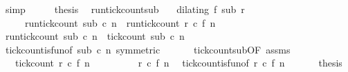 \begin{isabellebody}
\ simp\isanewline
\ \ \isamarkupfalse%
\ \isamarkupfalse%
\ {\isacharquery}thesis\ \isacommand{{\isachardot}}\isamarkupfalse%
\isanewline
{}\isamarkupfalse%
%
\endisatagproof
{\isafoldproof}%
%
\isadelimproof
\isanewline
%
\endisadelimproof
\isanewline
{}\isamarkupfalse%
\ run{\isacharunderscore}tick{\isacharunderscore}count{\isacharunderscore}sub{\isacharcolon}\isanewline
\ \ \ {\isacartoucheopen}dilating\ f\ sub\ r{\isacartoucheclose}\isanewline
\ \ \ \ \ {\isacartoucheopen}run{\isacharunderscore}tick{\isacharunderscore}count\ sub\ c\ n\ {\isacharequal}\ run{\isacharunderscore}tick{\isacharunderscore}count\ r\ c\ {\isacharparenleft}f\ n{\isacharparenright}{\isacartoucheclose}\isanewline
%
\isadelimproof
%
\endisadelimproof
%
\isatagproof
{}\isamarkupfalse%
\ {\isacharminus}\isanewline
\ \ \isamarkupfalse%
\ {\isacartoucheopen}run{\isacharunderscore}tick{\isacharunderscore}count\ sub\ c\ n\ {\isacharequal}\ tick{\isacharunderscore}count\ sub\ c\ n{\isacartoucheclose}\isanewline
\ \ \ \ \isamarkupfalse%
\ tick{\isacharunderscore}count{\isacharunderscore}is{\isacharunderscore}fun{\isacharbrackleft}of\ {\isacartoucheopen}sub{\isacartoucheclose}\ c\ n{\isacharcomma}\ symmetric{\isacharbrackright}\ \isacommand{{\isachardot}}\isamarkupfalse%
\isanewline
\ \ \isamarkupfalse%
\ \isamarkupfalse%
\ tick{\isacharunderscore}count{\isacharunderscore}sub{\isacharbrackleft}OF\ assms{\isacharbrackright}\ \isamarkupfalse%
\ {\isacartoucheopen}{\isachardot}{\isachardot}{\isachardot}\ {\isacharequal}\ tick{\isacharunderscore}count\ r\ c\ {\isacharparenleft}f\ n{\isacharparenright}{\isacartoucheclose}\ \isacommand{{\isachardot}}\isamarkupfalse%
\isanewline
\ \ \isamarkupfalse%
\ \isamarkupfalse%
\ {\isacartoucheopen}{\isachardot}{\isachardot}{\isachardot}\ {\isacharequal}\ {\isacharhash}\isactrlsub {\isasymle}\ r\ c\ {\isacharparenleft}f\ n{\isacharparenright}{\isacartoucheclose}\ \isamarkupfalse%
\ tick{\isacharunderscore}count{\isacharunderscore}is{\isacharunderscore}fun{\isacharbrackleft}of\ r\ c\ {\isacartoucheopen}f\ n{\isacartoucheclose}{\isacharbrackright}\ \isacommand{{\isachardot}}\isamarkupfalse%
\isanewline
\ \ \isamarkupfalse%
\ \isamarkupfalse%
\ {\isacharquery}thesis\ \isacommand{{\isachardot}}\isamarkupfalse%
\isanewline
{}\isamarkupfalse%
%
\endisatagproof

\end{isabellebody}
